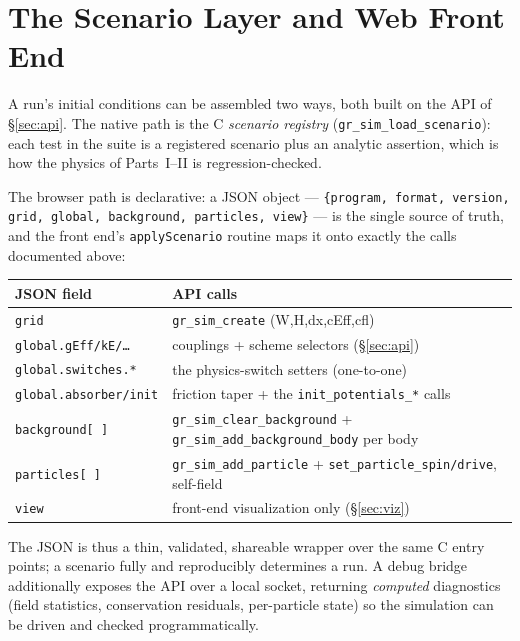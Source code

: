 \documentclass[11pt]{article}
\begin{document}
\section{The Scenario Layer and Web Front End}
\label{sec:scenario}

A run's initial conditions can be assembled two ways, both built on the API of
\S\ref{sec:api}. The native path is the C \emph{scenario registry}
(\texttt{gr\_sim\_load\_scenario}): each test in the suite is a registered
scenario plus an analytic assertion, which is how the physics of Parts~I--II is
regression-checked.

The browser path is declarative: a JSON object ---
\texttt{\{program, format, version, grid, global, background, particles, view\}}
--- is the single source of truth, and the front end's \texttt{applyScenario}
routine maps it onto exactly the calls documented above:
\begin{center}
\begin{tabular}{@{}L{5.0cm}L{8.6cm}@{}}
\toprule
\textbf{JSON field} & \textbf{API calls} \\
\midrule
\texttt{grid}                & \texttt{gr\_sim\_create} (W,H,dx,cEff,cfl) \\
\texttt{global.gEff/kE/\dots}  & couplings + scheme selectors (\S\ref{sec:api}) \\
\texttt{global.switches.*}    & the physics-switch setters (one-to-one) \\
\texttt{global.absorber/init} & friction taper + the \texttt{init\_potentials\_*} calls \\
\texttt{background[\,]}        & \texttt{gr\_sim\_clear\_background} + \texttt{gr\_sim\_add\_background\_body} per body \\
\texttt{particles[\,]}        & \texttt{gr\_sim\_add\_particle} + \texttt{set\_particle\_spin/drive}, self-field \\
\texttt{view}                & front-end visualization only (\S\ref{sec:viz}) \\
\bottomrule
\end{tabular}
\end{center}
The JSON is thus a thin, validated, shareable wrapper over the same C entry
points; a scenario fully and reproducibly determines a run. A debug bridge
additionally exposes the API over a local socket, returning \emph{computed}
diagnostics (field statistics, conservation residuals, per-particle state) so the
simulation can be driven and checked programmatically.
\end{document}
